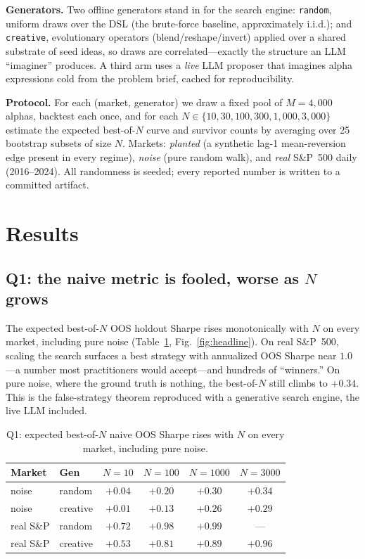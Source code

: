 \documentclass[sigconf,review,anonymous]{acmart}
\begin{document}
\textbf{Generators.} Two offline generators stand in for the search engine: \texttt{random}, uniform draws over the DSL (the brute-force baseline, approximately i.i.d.); and \texttt{creative}, evolutionary operators (blend/reshape/invert) applied over a shared substrate of seed ideas, so draws are correlated---exactly the structure an LLM ``imaginer'' produces. A third arm uses a \emph{live} LLM proposer that imagines alpha expressions cold from the problem brief, cached for reproducibility.

\textbf{Protocol.} For each (market, generator) we draw a fixed pool of $M{=}4{,}000$ alphas, backtest each once, and for each $N\in\{10,30,100,300,1{,}000,3{,}000\}$ estimate the expected best-of-$N$ curve and survivor counts by averaging over 25 bootstrap subsets of size $N$. Markets: \emph{planted} (a synthetic lag-1 mean-reversion edge present in every regime), \emph{noise} (pure random walk), and \emph{real} S\&P~500 daily (2016--2024). All randomness is seeded; every reported number is written to a committed artifact.

\section{Results}
\subsection{Q1: the naive metric is fooled, worse as $N$ grows}
The expected best-of-$N$ OOS holdout Sharpe rises monotonically with $N$ on every market, including pure noise (Table~\ref{tab:q1}, Fig.~\ref{fig:headline}). On real S\&P~500, scaling the search surfaces a best strategy with annualized OOS Sharpe near $1.0$---a number most practitioners would accept---and hundreds of ``winners.'' On pure noise, where the ground truth is nothing, the best-of-$N$ still climbs to $+0.34$. This is the false-strategy theorem reproduced with a generative search engine, the live LLM included.

\begin{table}[t]
\caption{Q1: expected best-of-$N$ naive OOS Sharpe rises with $N$ on every market, including pure noise.}
\label{tab:q1}
\small
\begin{tabular}{@{}llcccc@{}}
\toprule
Market & Gen & $N{=}10$ & $N{=}100$ & $N{=}1000$ & $N{=}3000$ \\
\midrule
noise & random & $+0.04$ & $+0.20$ & $+0.30$ & $+0.34$ \\
noise & creative & $+0.01$ & $+0.13$ & $+0.26$ & $+0.29$ \\
real S\&P & random & $+0.72$ & $+0.98$ & $+0.99$ & --- \\
real S\&P & creative & $+0.53$ & $+0.81$ & $+0.89$ & $+0.96$ \\
\bottomrule
\end{tabular}
\end{table}
\end{document}
